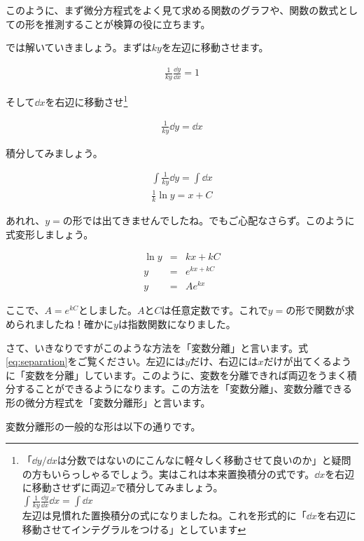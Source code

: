 このように、まず微分方程式をよく見て求める関数のグラフや、関数の数式としての形を推測することが検算の役に立ちます。

では解いていきましょう。まずは$ky$を左辺に移動させます。

\begin{eqnarray}
    \frac{1}{ky}\frac{\dd y}{\dd x}=1
\end{eqnarray}

\noindent
そして$\dd x$を右辺に移動させ\footnote{「$\dd y/\dd x$は分数ではないのにこんなに軽々しく移動させて良いのか」と疑問の方もいらっしゃるでしょう。実はこれは本来置換積分の式です。$\dd x$を右辺に移動させずに両辺$x$で積分してみましょう。 \\
$\int\frac{1}{ky}\frac{\dd y}{\dd x}\dd x=\int\dd x$ \\
左辺は見慣れた置換積分の式になりましたね。これを形式的に「$\dd x$を右辺に移動させてインテグラルをつける」としています}

\begin{eqnarray}
    \label{eq:separation}
    \frac{1}{ky}\dd y=\dd x
\end{eqnarray}

\noindent
積分してみましょう。

\begin{eqnarray}
    \int\frac{1}{ky}\dd y=\int\dd x \\
    \frac{1}{k}\ln y = x+C
\end{eqnarray}

\noindent
あれれ、$y=$の形では出てきませんでしたね。でもご心配なさらず。このように式変形しましょう。

\begin{eqnarray}
    \ln y&=&kx+kC \nonumber\\
    y&=&e^{kx+kC} \nonumber\\
    y&=&Ae^{kx}
\end{eqnarray}

\noindent
ここで、$A=e^{kC}$としました。$A$と$C$は任意定数です。これで$y=$の形で関数が求められましたね！確かに$y$は指数関数になりました。

さて、いきなりですがこのような方法を「変数分離」と言います。式\ref{eq:separation}をご覧ください。左辺には$y$だけ、右辺には$x$だけが出てくるように「変数を分離」しています。このように、変数を分離できれば両辺をうまく積分することができるようになります。この方法を「変数分離」、変数分離できる形の微分方程式を「変数分離形」と言います。

変数分離形の一般的な形は以下の通りです。

